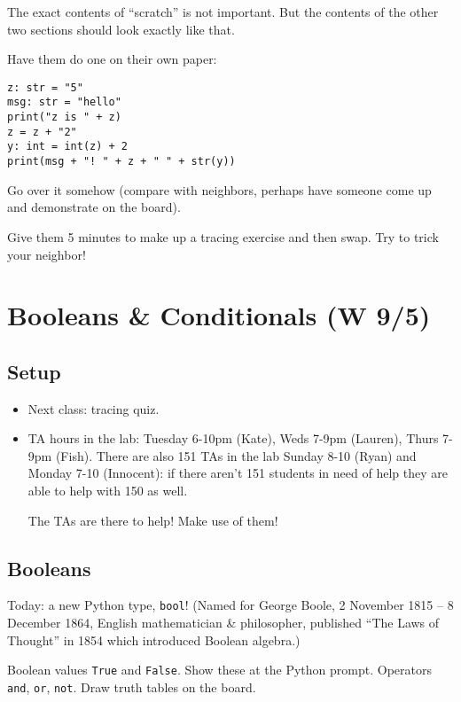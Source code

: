 \documentclass{article}
\begin{document}
The exact contents of ``scratch'' is not important.  But the contents
of the other two sections should look exactly like that.

Have them do one on their own paper:

\begin{verbatim}
z: str = "5"
msg: str = "hello"
print("z is " + z)
z = z + "2"
y: int = int(z) + 2
print(msg + "! " + z + " " + str(y))
\end{verbatim}

Go over it somehow (compare with neighbors, perhaps have someone come
up and demonstrate on the board).

Give them 5 minutes to make up a tracing exercise and then swap.  Try
to trick your neighbor!

\newpage

\section{Booleans \& Conditionals (W 9/5)}

\subsection*{Setup}

\begin{itemize}
\item Next class: tracing quiz.
\item TA hours in the lab: Tuesday 6-10pm (Kate), Weds 7-9pm (Lauren),
  Thurs 7-9pm (Fish).  There are also 151 TAs in the lab Sunday 8-10
  (Ryan) and Monday 7-10 (Innocent): if there aren't 151 students in
  need of help they are able to help with 150 as well.

  The TAs are there to help!  Make use of them!
\end{itemize}

\subsection*{Booleans}

Today: a new Python type, {\tt bool}! (Named for George Boole, 2
November 1815 -- 8 December 1864, English mathematician \&
philosopher, published ``The Laws of Thought'' in 1854 which
introduced Boolean algebra.)

Boolean values {\tt True} and {\tt False}.  Show these at the Python
prompt.  Operators {\tt and}, {\tt or}, {\tt not}.  Draw truth tables
on the board.
\end{document}
